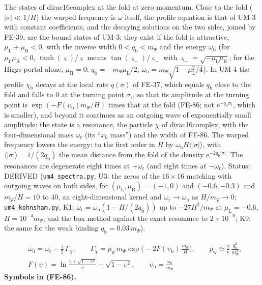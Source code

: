 \documentclass[
  10pt,
]{article}
\begin{document}
The states of dirac16complex at the fold at zero momentum. Close to the
fold (\(\lvert\sigma\rvert \ll 1/H\)) the warped frequency is \(\omega\)
itself, the profile equation is that of UM-3 with constant coefficients,
and the decaying solutions on the two sides, joined by FE-39, are the
bound states of UM-3: they exist if the fold is attractive,
\(\mu_{\mathrm{L}} + \mu_{\mathrm{R}} < 0\), with the inverse width
\(0 < q_{\mathrm{b}} < m_\Psi\) and the energy \(\omega_{\mathrm{b}}\)
(for \(\mu_{\mathrm{L}}\mu_{\mathrm{R}} < 0\),
\(\tanh(\varsigma)/\varsigma\) means \(\tan(\varsigma_-)/\varsigma_-\)
with \(\varsigma_- = \sqrt{-\mu_{\mathrm{L}}\mu_{\mathrm{R}}}\); for the
Higgs portal alone, \(\mu_{\mathrm{R}} = 0\):
\(q_{\mathrm{b}} = -m_\Psi\mu_{\mathrm{L}}/2\),
\(\omega_{\mathrm{b}} = m_\Psi\sqrt{1 - \mu_{\mathrm{L}}^2/4}\)). In
UM-4 the profile \(\chi_{\mathrm{b}}\) decays at the local rate
\(q(\sigma)\) of FE-37, which equals \(q_{\mathrm{b}}\) close to the
fold and falls to 0 at the turning point \(\sigma_{\mathrm{t}}\), so
that its amplitude at the turning point is
\(\exp(-F(\upsilon_{\mathrm{b}})m_\Psi/H)\) times that at the fold
(FE-86; not \(\mathrm{e}^{-q_{\mathrm{b}}\sigma_{\mathrm{t}}}\), which
is smaller), and beyond it continues as an outgoing wave of
exponentially small amplitude: the state is a resonance, the particle
\(\chi\) of dirac16complex, with the four-dimensional mass
\(\omega_{\mathrm{r}}\) (its ``\(x_0\) mass'') and the width of FE-86.
The warped frequency lowers the energy: to the first order in \(H\) by
\(\omega_{\mathrm{b}}H\langle\lvert\sigma\rvert\rangle\), with
\(\langle\lvert\sigma\rvert\rangle = 1/(2q_{\mathrm{b}})\) the mean
distance from the fold of the density
\(\mathrm{e}^{-2q_{\mathrm{b}}\lvert\sigma\rvert}\). The resonances are
degenerate eight times at \(+\omega_{\mathrm{r}}\) (and eight times at
\(-\omega_{\mathrm{r}}\)). Status: DERIVED (\texttt{um4\_spectra.py},
U3: the zeros of the \(16 \times 16\) matching with outgoing waves on
both sides, for \((\mu_{\mathrm{L}}, \mu_{\mathrm{R}}) = (-1, 0)\) and
\((-0.6, -0.3)\) and \(m_\Psi/H = 10\) to 40, an eight-dimensional
kernel and \(\omega_{\mathrm{r}} \to \omega_{\mathrm{b}}\) as
\(H/m_\Psi \to 0\); \texttt{um4\_kohnsham.py}, K1:
\(\omega_{\mathrm{r}} = \omega_{\mathrm{b}}(1 - H/(2q_{\mathrm{b}}))\)
up to \(-27H^2/m_\Psi\) at \(\mu_{\mathrm{L}} = -0.6\),
\(H = 10^{-4}m_\Psi\), and the box method against the exact resonance to
\(2\times10^{-9}\); K9: the same for the weak binding
\(q_{\mathrm{b}} = 0.03\,m_\Psi\)).

\[
\begin{aligned}
&\omega_0 = \omega_{\mathrm{r}} - \frac{\mathrm{i}}{2}\,\Gamma_\chi,\qquad
\Gamma_\chi = p_{\mathrm{w}}\,m_\Psi\exp\Big(-2F(\upsilon_{\mathrm{b}})\,\frac{m_\Psi}{H}\Big),\qquad
p_{\mathrm{w}} \simeq \frac{2}{\mathrm{e}}\,\frac{q_{\mathrm{b}}^2}{m_\Psi^2},\\
&F(\upsilon) = \ln\frac{1 + \sqrt{1 - \upsilon^2}}{\upsilon} - \sqrt{1 - \upsilon^2},\qquad \upsilon_{\mathrm{b}} = \frac{\omega_{\mathrm{b}}}{m_\Psi}
\end{aligned} \tag{FE-86}
\] \textbf{Symbols in (FE-86).}
\end{document}
